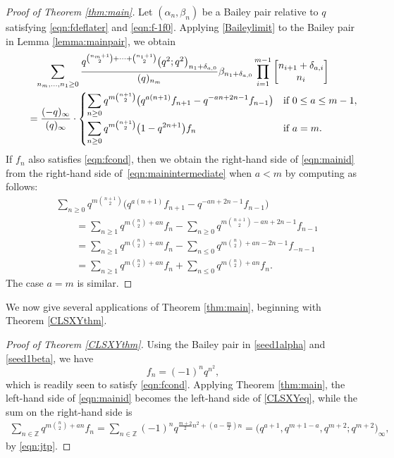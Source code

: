 \documentclass[pdftex]{sigma}
\numberwithin{equation}{section}
\newcommand{\ZZ}{\mathbb{Z}}
\begin{document}
\begin{proof}[Proof of Theorem \ref{thm:main}]
	Let $(\alpha_n,\beta_n)$ be a Bailey pair relative to $q$ satisfying \eqref{eqn:fdeflater} and \eqref{eqn:f-1f0}.
	Applying \eqref{Baileylimit} to the Bailey pair in Lemma \ref{lemma:mainpair}, we obtain
	\begin{gather}
			\sum_{n_m, \dots, n_1 \geq 0} \frac{q^{\binom{n_m+1}{2} + \cdots + \binom{n_1+1}{2}}\bigl(q^2;q^2\bigr)_{n_1+\delta_{a,0}}}{(q)_{n_m}} \beta_{n_1+\delta_{a,0}} \prod_{i=1}^{m-1} \begin{bmatrix} n_{i+1} + \delta_{a,i} \\ n_i \end{bmatrix}
			\nonumber\\
			\qquad{}=
			\frac{(-q)_{\infty}}{(q)_\infty}\cdot
			\begin{cases}
				\displaystyle\sum_{n\geq 0}
				q^{m\binom{n+1}{2}}\bigl(
				q^{a(n+1)}f_{n+1} -q^{-an+2n-1}f_{n-1}\bigr)
				& \text{if $0\leq a \leq m-1$},\vspace{1mm}\\
				\displaystyle\sum_{n\geq 0}
				q^{m\binom{n+1}{2}}\bigl(
				1-q^{2n+1}\bigr)f_n
				& \text{if $a=m$}.
			\end{cases} \label{eqn:mainintermediate}
	\end{gather}
	If $f_n$ also satisfies \eqref{eqn:fcond}, then we obtain the right-hand side of \eqref{eqn:mainid} from the right-hand side of~\eqref{eqn:mainintermediate} when $a <m$ by computing as follows:
	\begin{align*}
		&\sum_{n\geq 0}
		q^{m\binom{n+1}{2}}\bigl(
		q^{a(n+1)}f_{n+1} -q^{-an+2n-1}f_{n-1}\bigr) \\
		&\qquad{}=\sum_{n\geq 1}q^{m\binom{n}{2}+an}f_n
		-\sum_{n\geq 0}
		q^{m\binom{n+1}{2}-an+2n-1}f_{n-1}\\
		&\qquad{}=\sum_{n\geq 1}q^{m\binom{n}{2}+an}f_n
		-\sum_{n\leq 0}
		q^{m\binom{n}{2}+an-2n-1}f_{-n-1} \\
		&\qquad{}=\sum_{n\geq 1}q^{m\binom{n}{2}+an}f_n
		+\sum_{n\leq 0}
		q^{m\binom{n}{2}+an}f_{n}.
	\end{align*}
	The case $a=m$ is similar.
\end{proof}

We now give several applications of Theorem \ref{thm:main}, beginning with Theorem \ref{CLSXYthm}.

\begin{proof}[Proof of Theorem \ref{CLSXYthm}]
	Using the Bailey pair in \eqref{seed1alpha} and \eqref{seed1beta}, we have
	\begin{equation*}
		f_n = (-1)^nq^{n^2},
	\end{equation*}
	which is readily seen to satisfy \eqref{eqn:fcond}.
	Applying Theorem \ref{thm:main}, the left-hand side of \eqref{eqn:mainid} becomes the left-hand side of \eqref{CLSXYeq}, while the sum on the right-hand side is
	\begin{align*}
		\sum_{n\in\ZZ}q^{m\binom{n}{2}+an}f_n =
		\sum_{n\in\ZZ}(-1)^nq^{\frac{m+2}{2}n^2+(a-\frac{m}{2})n }
		 =\bigl( q^{a+1} , q^{m+1-a} , q^{m+2};q^{m+2}\bigr)_\infty,
	\end{align*}
	by \eqref{eqn:jtp}.
\end{proof}
\end{document}
